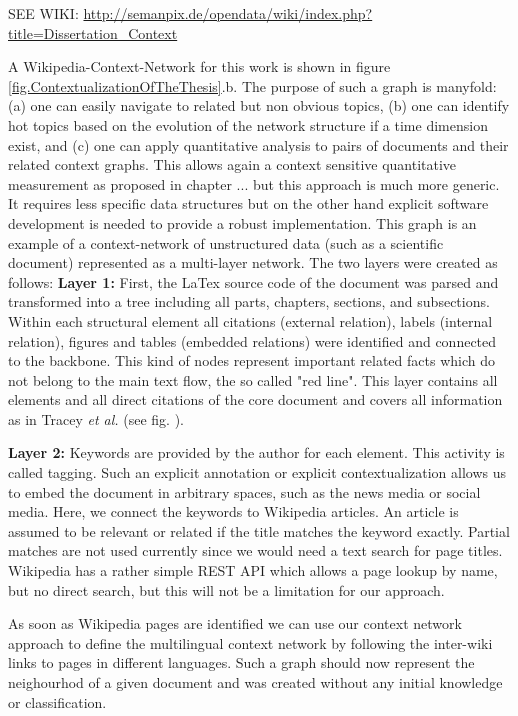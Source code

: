 \documentclass[a4paper,10pt]{scrbook}
\begin{document}
\label{ext.fig.ContextualizationOfTheThesis} 


SEE WIKI: \url{http://semanpix.de/opendata/wiki/index.php?title=Dissertation_Context} 

A Wikipedia-Context-Network for this work is shown in figure \ref{fig.ContextualizationOfTheThesis}.b. The purpose of such a graph is manyfold: (a) one can easily navigate to related but non obvious topics, (b) one can identify hot topics based on the evolution of the network structure if a time dimension exist, and (c) one can apply quantitative analysis to pairs of documents and their related context graphs. This allows again a context sensitive quantitative measurement as proposed in chapter ... but this approach is much more generic. It requires less specific data structures but on the other hand explicit software development is needed to provide a robust implementation. This graph is an example of a context-network of unstructured data (such as a scientific document) represented as a multi-layer network. The two layers were created as follows: 
\textbf{Layer 1:} First, the LaTex source code of the document was parsed and transformed into a tree including all parts, chapters, sections, and subsections. Within each structural element all citations (external relation), labels (internal relation), figures and tables (embedded relations) were identified and connected to the backbone. This kind of nodes represent important related facts which do not belong to the main text flow, the so called "red line". This layer contains all elements and all direct citations of the core document and covers all information as in Tracey \textit{et al.} (see fig. \label{fig.ContextualizationOfTheThesis}).

\textbf{Layer 2:} Keywords are provided by the author for each element. This activity is called tagging. Such an explicit annotation or explicit contextualization allows us to embed the document in arbitrary spaces, such as the news media or social media. Here, we connect the keywords to Wikipedia articles. An article is assumed to be relevant or related if the title matches the keyword exactly. Partial matches are not used currently since we would need a text search for page titles. Wikipedia has a rather simple REST API which allows a page lookup by name, but no direct search, but this will not be a limitation for our approach.

As soon as Wikipedia pages are identified we can use our context network approach to define the multilingual context network by following the inter-wiki links to pages in different languages. Such a graph should now represent the neighourhod of a given document and was created without any initial knowledge or classification.
\end{document}
